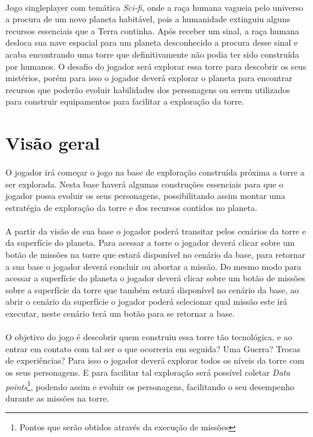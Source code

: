 \documentclass[11pt]{article} %
\begin{document}
\paragraph{}Jogo singleplayer com temática \textit{Sci-fi}, onde a raça humana vagueia pelo universo a procura de um novo planeta habitável, pois a humanidade extinguiu alguns recursos essenciais que a Terra continha. Após receber um sinal, a raça humana desloca sua nave espacial para um planeta desconhecido a procura desse sinal e acaba encontrando uma torre que definitivamente não podia ter sido construída por humanos. O desafio do jogador será explorar essa torre para descobrir os seus mistérios, porém para isso o jogador deverá explorar o planeta para encontrar recursos que poderão evoluir habilidades dos personagens ou serem utilizados para construir equipamentos para facilitar a exploração da torre.


\section{Visão geral}

\paragraph{}O jogador irá começar o jogo na base de exploração construída próxima a torre a ser explorada. Nesta base haverá algumas construções essenciais para que o jogador possa evoluir os seus personagens, possibilitando assim montar uma estratégia de exploração da torre e dos recursos contidos no planeta.

\paragraph{}A partir da visão de sua base o jogador poderá transitar pelos cenários da torre e da superfície do planeta. Para acessar a torre o jogador deverá clicar sobre um botão de missões na torre que estará disponível no cenário da base, para retornar a sua base o jogador deverá concluir ou abortar a missão. Do mesmo modo para acessar a superfície do planeta o jogador deverá clicar sobre um botão de missões sobre a superfície da torre que também estará disponível no cenário da base, ao abrir o cenário da superfície o jogador poderá selecionar qual missão este irá executar, neste cenário terá um botão para se retornar a base.

\paragraph{}O objetivo do jogo é descobrir quem construiu essa torre tão tecnológica, e ao entrar em contato com tal ser o que ocorreria em seguida? Uma Guerra? Trocas de experiências? Para isso o jogador deverá explorar todos os níveis da torre com os seus personagens. E para facilitar tal exploração será possível coletar \textit{Data points}\footnote{Pontos que serão obtidos através da execução de missões}, podendo assim e evoluir os personagens, facilitando o seu desempenho durante as missões na torre. 
\end{document}

